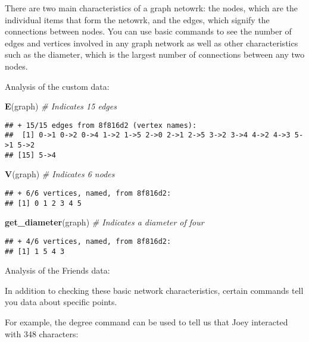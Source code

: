 \documentclass[]{article}
\newenvironment{Shaded}{\begin{snugshade}}{\end{snugshade}}
\newcommand{\KeywordTok}[1]{\textcolor[rgb]{0.13,0.29,0.53}{\textbf{#1}}}
\newcommand{\CommentTok}[1]{\textcolor[rgb]{0.56,0.35,0.01}{\textit{#1}}}
\newcommand{\NormalTok}[1]{#1}
\begin{document}
There are two main characteristics of a graph netowrk: the nodes, which
are the individual items that form the netowrk, and the edges, which
signify the connections between nodes. You can use basic commands to see
the number of edges and vertices involved in any graph network as well
as other characteristics such as the diameter, which is the largest
number of connections between any two nodes.

Analysis of the custom data:

\begin{Shaded}
\begin{Highlighting}[]
\KeywordTok{E}\NormalTok{(graph) }\CommentTok{# Indicates 15 edges}
\end{Highlighting}
\end{Shaded}

\begin{verbatim}
## + 15/15 edges from 8f816d2 (vertex names):
##  [1] 0->1 0->2 0->4 1->2 1->5 2->0 2->1 2->5 3->2 3->4 4->2 4->3 5->1 5->2
## [15] 5->4
\end{verbatim}

\begin{Shaded}
\begin{Highlighting}[]
\KeywordTok{V}\NormalTok{(graph) }\CommentTok{# Indicates 6 nodes}
\end{Highlighting}
\end{Shaded}

\begin{verbatim}
## + 6/6 vertices, named, from 8f816d2:
## [1] 0 1 2 3 4 5
\end{verbatim}

\begin{Shaded}
\begin{Highlighting}[]
\KeywordTok{get_diameter}\NormalTok{(graph) }\CommentTok{# Indicates a diameter of four}
\end{Highlighting}
\end{Shaded}

\begin{verbatim}
## + 4/6 vertices, named, from 8f816d2:
## [1] 1 5 4 3
\end{verbatim}

Analysis of the Friends data:

In addition to checking these basic network characteristics, certain
commands tell you data about specific points.

For example, the degree command can be used to tell us that Joey
interacted with 348 characters:
\end{document}
